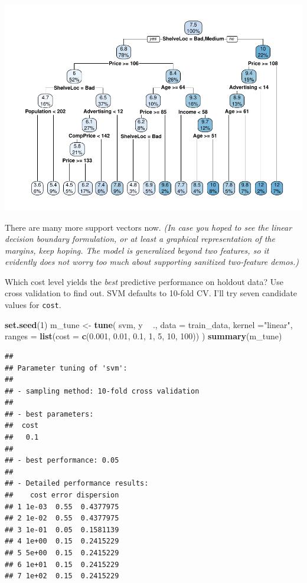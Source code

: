 \documentclass[]{book}
\newenvironment{Shaded}{\begin{snugshade}}{\end{snugshade}}
\newcommand{\DataTypeTok}[1]{\textcolor[rgb]{0.13,0.29,0.53}{#1}}
\newcommand{\DecValTok}[1]{\textcolor[rgb]{0.00,0.00,0.81}{#1}}
\newcommand{\FloatTok}[1]{\textcolor[rgb]{0.00,0.00,0.81}{#1}}
\newcommand{\KeywordTok}[1]{\textcolor[rgb]{0.13,0.29,0.53}{\textbf{#1}}}
\newcommand{\NormalTok}[1]{#1}
\newcommand{\OperatorTok}[1]{\textcolor[rgb]{0.81,0.36,0.00}{\textbf{#1}}}
\newcommand{\StringTok}[1]{\textcolor[rgb]{0.31,0.60,0.02}{#1}}
\begin{document}
\includegraphics{data-sci_files/figure-latex/unnamed-chunk-96-1.pdf}

There are many more support vectors now. \emph{(In case you hoped to see the linear decision boundary formulation, or at least a graphical representation of the margins, keep hoping. The model is generalized beyond two features, so it evidently does not worry too much about supporting sanitized two-feature demos.)}

Which cost level yields the \emph{best} predictive performance on holdout data? Use cross validation to find out. SVM defaults to 10-fold CV. I'll try seven candidate values for \texttt{cost}.

\begin{Shaded}
\begin{Highlighting}[]
\KeywordTok{set.seed}\NormalTok{(}\DecValTok{1}\NormalTok{)}
\NormalTok{m_tune <-}\StringTok{ }\KeywordTok{tune}\NormalTok{(}
\NormalTok{  svm,}
\NormalTok{  y }\OperatorTok{~}\StringTok{ }\NormalTok{.,}
  \DataTypeTok{data =}\NormalTok{ train_data,}
  \DataTypeTok{kernel =}\StringTok{"linear"}\NormalTok{,}
  \DataTypeTok{ranges =} \KeywordTok{list}\NormalTok{(}\DataTypeTok{cost =} \KeywordTok{c}\NormalTok{(}\FloatTok{0.001}\NormalTok{, }\FloatTok{0.01}\NormalTok{, }\FloatTok{0.1}\NormalTok{, }\DecValTok{1}\NormalTok{, }\DecValTok{5}\NormalTok{, }\DecValTok{10}\NormalTok{, }\DecValTok{100}\NormalTok{))}
\NormalTok{)}
\KeywordTok{summary}\NormalTok{(m_tune)}
\end{Highlighting}
\end{Shaded}

\begin{verbatim}
## 
## Parameter tuning of 'svm':
## 
## - sampling method: 10-fold cross validation 
## 
## - best parameters:
##  cost
##   0.1
## 
## - best performance: 0.05 
## 
## - Detailed performance results:
##    cost error dispersion
## 1 1e-03  0.55  0.4377975
## 2 1e-02  0.55  0.4377975
## 3 1e-01  0.05  0.1581139
## 4 1e+00  0.15  0.2415229
## 5 5e+00  0.15  0.2415229
## 6 1e+01  0.15  0.2415229
## 7 1e+02  0.15  0.2415229
\end{verbatim}
\end{document}
